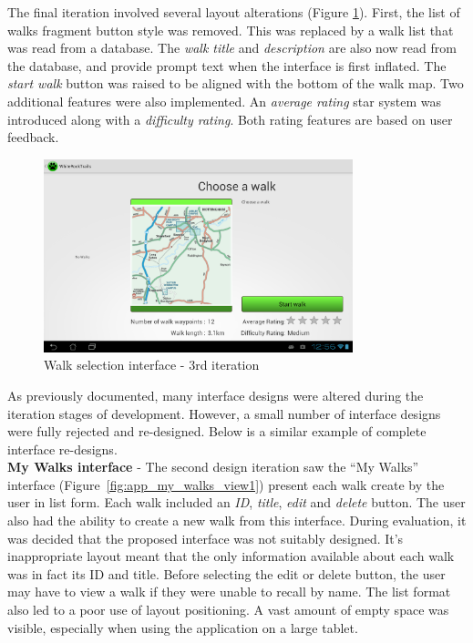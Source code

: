 \documentclass[11pt,a4paper]{report}
\begin{document}
The final iteration involved several layout alterations (Figure \ref*{fig:choose_walk3}). First, the list of walks fragment button style was removed. This was replaced by a walk list that was read from a database. The \emph{walk title} and \emph{description} are also now read from the database, and provide prompt text when the interface is first inflated. The \emph{start walk} button was raised to be aligned with the bottom of the walk map. Two additional features were also implemented. An \emph{average rating} star system was introduced along with a \emph{difficulty rating}. Both rating features are based on user feedback.

\begin{figure}[H]
    \centering
    \includegraphics[width=0.8\textwidth]{chris/final_choose_walk}
    \caption{Walk selection interface - 3rd iteration }
    \label{fig:choose_walk3}
\end{figure}


As previously documented, many interface designs were altered during the iteration stages of development. However, a small number of interface designs were fully rejected and re-designed. Below is a similar example of complete interface re-designs.\\

\textbf{My Walks interface} - The second design iteration saw the ``My Walks'' interface (Figure~\ref{fig:app_my_walks_view1}) present each walk create by the user in list form. Each walk included an \emph{ID}, \emph{title}, \emph{edit} and \emph{delete} button. The user also had the ability to create a new walk from this interface. During evaluation, it was decided that the proposed interface was not suitably designed. It's inappropriate layout meant that the only information available about each walk was in fact its ID and title. Before selecting the edit or delete button, the user may have to view a walk if they were unable to recall by name. The list format also led to a poor use of layout positioning. A vast amount of empty space was visible, especially when using the application on a large tablet.
\end{document}

